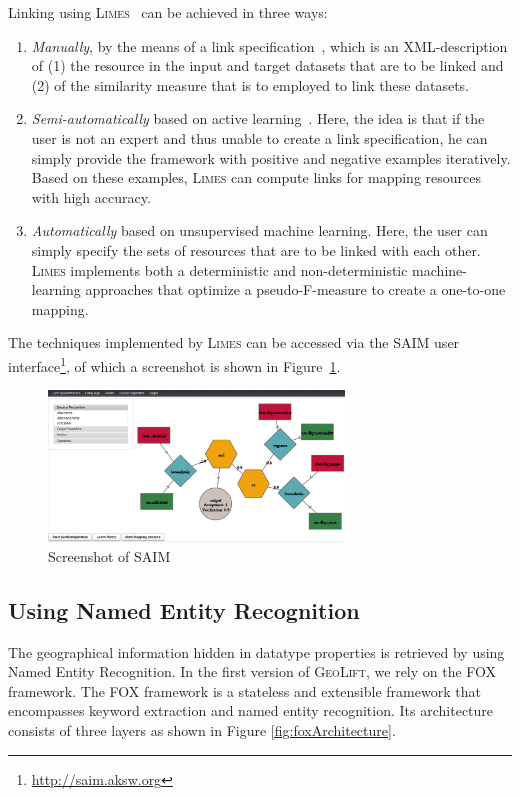 \documentclass[a4paper,twoside,bibtotoc,abstracton,12pt,BCOR=15mm]{article}
\newcommand{\geolift}{\textsc{GeoLift}\xspace}
\newcommand{\limes}{\textsc{Limes}\xspace}
\begin{document}
Linking using \limes~\cite{NGON12c,NGON12} can be achieved in three ways:
\begin{enumerate}
\item \emph{Manually}, by the means of a link specification~\cite{NGON12c}, which is an XML-description of (1) the resource in the input and target datasets that are to be linked and (2) of the similarity measure that is to employed to link these datasets.
\item \emph{Semi-automatically} based on active learning~\cite{NGO+11a,NGLY12,NGO+13b}. Here, the idea is that if the user is not an expert and thus unable to create a link specification, he can simply provide the framework with positive and negative examples iteratively. 
Based on these examples, \limes can compute links for mapping resources with high accuracy.
\item \emph{Automatically} based on unsupervised machine learning. Here, the user can simply specify the sets of resources that are to be linked with each other. 
\limes implements both a deterministic and non-deterministic machine-learning approaches that optimize a pseudo-F-measure to create a one-to-one mapping.
\end{enumerate}

The techniques implemented by \limes can be accessed via the SAIM user interface\footnote{\url{http://saim.aksw.org}}, of which a screenshot is shown in Figure~\ref{fig:saim_screenshot}.
\begin{figure}[htb]
\centering
\includegraphics[width=0.7\textwidth]{images/saim_screenshot}
\caption{Screenshot of SAIM}
\label{fig:saim_screenshot}
\end{figure}

\subsection{Using Named Entity Recognition}
The geographical information hidden in datatype properties is retrieved by using Named Entity Recognition.
In the first version of \geolift, we rely on the FOX framework.
The FOX framework is a stateless and extensible framework that encompasses keyword extraction and named entity recognition. 
Its architecture consists of three layers as shown in Figure \ref{fig:foxArchitecture}.
\end{document}
